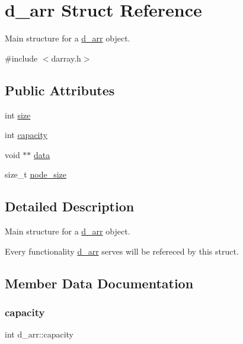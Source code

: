 \hypertarget{structd__arr}{}\section{d\+\_\+arr Struct Reference}
\label{structd__arr}


Main structure for a \hyperlink{structd__arr}{d\+\_\+arr} \textquotesingle{}object\textquotesingle{}.  




{\ttfamily \#include $<$darray.\+h$>$}

\subsection*{Public Attributes}
\begin{DoxyCompactItemize}
\item 
int \hyperlink{structd__arr_ac5e655e0679e8b2ea60e0dc390d59ba3}{size}
\item 
int \hyperlink{structd__arr_af453f35b480d14aab29b3fb9cd3a5e32}{capacity}
\item 
void $\ast$$\ast$ \hyperlink{structd__arr_adbb6770d58b27c30de20b1aa197727af}{data}
\item 
size\+\_\+t \hyperlink{structd__arr_a01aabd30c87fd56ce6c027324067ef0c}{node\+\_\+size}
\end{DoxyCompactItemize}


\subsection{Detailed Description}
Main structure for a \hyperlink{structd__arr}{d\+\_\+arr} \textquotesingle{}object\textquotesingle{}. 

Every functionality \hyperlink{structd__arr}{d\+\_\+arr} serves will be refereced by this struct. 

\subsection{Member Data Documentation}
\mbox{\label{structd__arr_af453f35b480d14aab29b3fb9cd3a5e32}} 
\subsubsection{\texorpdfstring{capacity}{capacity}}
{\footnotesize\ttfamily int d\+\_\+arr\+::capacity}

